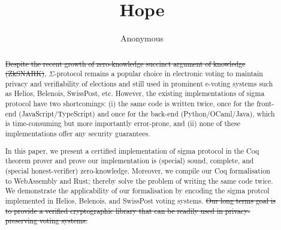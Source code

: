 \documentclass[conference,compsoc]{IEEEtran}
\begin{document}
\title{Hope}

\author{Anonymous}

\maketitle

\begin{abstract}
  \st{Despite the recent growth of zero-knowledge succinct argument 
  of knowledge (ZkSNARK)}, 
  $\Sigma$-protocol remains a popular choice in electronic voting to maintain privacy 
  and verifiability of elections and still used in prominent e-voting systems such as 
  Helios, Belenois, SwissPost, etc. However, 
  the existing implementations of sigma protocol have two 
  shortcomings: (i) the same code is written twice, once for the front-end (JavaScript/TypeScript)
  and once for the back-end (Python/OCaml/Java), which is time-consuming but more importantly error-prone, 
  and (ii) none of these implementations offer any security guarantees. 
  
  In this paper, we present a certified implementation of sigma protocol in the Coq theorem prover and
  prove our implementation is (special) sound, complete, and 
  (special honest-verifier) zero-knowledge. Moreover, 
  we compile our Coq formalisation to WebAssembly and Rust; 
  thereby solve the problem of writing the same code twice. 
  We demonstrate the applicability of our
  formalisation by encoding the sigma protcol implemented in 
  Helios, Belenois, and SwissPost voting systems. 
  \st{Our long terms goal is to provide a verified cryptographic library that can be 
  readily used in privacy-preserving voting systems.}
\end{abstract}





%
\IEEEpeerreviewmaketitle



\iffalse
\end{document}
